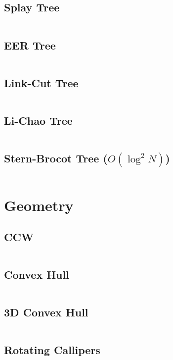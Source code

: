\documentclass[8pt, a4paper, oneside]{extarticle}
\begin{document}
\begin{multicols*}{2}
\subsection{Splay Tree}
\inputminted{c++}{codes/data_structure/splay_tree.cpp}

\subsection{EER Tree}
\inputminted{c++}{codes/data_structure/eer_tree.cpp}

\subsection{Link-Cut Tree}
\inputminted{c++}{codes/data_structure/link_cut_tree.cpp}

\subsection{Li-Chao Tree}
\inputminted{c++}{codes/data_structure/li_chao_tree.cpp}

\subsection{Stern-Brocot Tree ($O(\log^2 N)$)}
\inputminted{c++}{codes/data_structure/stern_brocot_tree.cpp}

\section{Geometry}
\subsection{CCW}
\inputminted{c++}{codes/geometry/ccw.cpp}

\subsection{Convex Hull}
\inputminted{c++}{codes/geometry/convex_hull.cpp}

\subsection{3D Convex Hull}
\inputminted{c++}{codes/geometry/convex_hull_3d.cpp}

\subsection{Rotating Callipers}
\inputminted{c++}{codes/geometry/rotating_callipers.cpp}


\end{multicols*}
\end{document}
